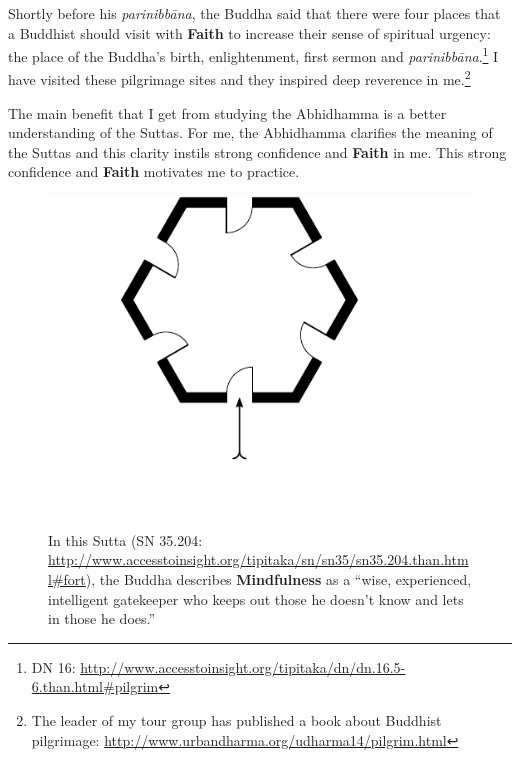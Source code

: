 Shortly before his \textit{parinibbāna}, the Buddha said that there were four places that a Buddhist should visit with \textbf{Faith} to increase their sense of spiritual urgency: the place of the Buddha’s birth, enlightenment, first sermon and \textit{parinibbāna}.\footnote{DN 16: \url{http://www.accesstoinsight.org/tipitaka/dn/dn.16.5-6.than.html\#pilgrim}} I have visited these pilgrimage sites and they inspired deep reverence in me.\footnote{The leader of my tour group has published a book about Buddhist pilgrimage: \url{http://www.urbandharma.org/udharma14/pilgrim.html}}

The main benefit that I get from studying the Abhidhamma is a better understanding of the Suttas. For me, the Abhidhamma clarifies the meaning of the Suttas and this clarity instils strong confidence and \textbf{Faith} in me. This strong confidence and \textbf{Faith} motivates me to practice.

\begin{figure}[h]
\centering
\includegraphics[width=1.0\linewidth]{./Diagrams/Fortress}
\caption{In this Sutta (SN 35.204: \url{http://www.accesstoinsight.org/tipitaka/sn/sn35/sn35.204.than.html\#fort}), the Buddha describes \textbf{Mindfulness} as a “wise, experienced, intelligent gatekeeper who keeps out those he doesn’t know and lets in those he does.”}
\label{fig:Fortress}
\end{figure}


